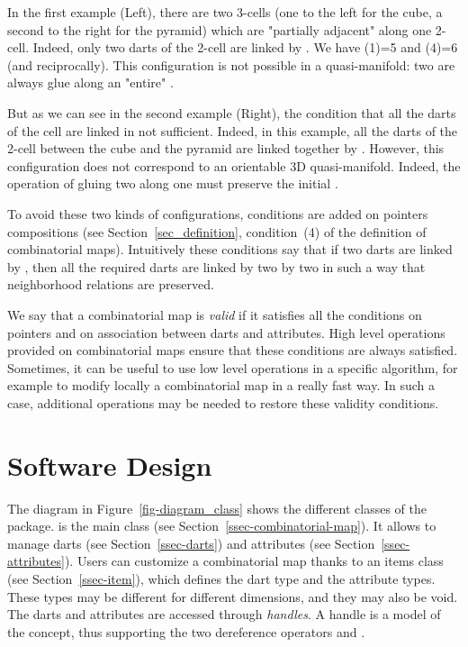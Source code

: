In the first example (Left), there are two 3-cells (one to the left
for the cube, a second to the right for the pyramid) which are
"partially adjacent" along one 2-cell. Indeed, only two darts
of the 2-cell are linked by \betatrois{}. We have \betatrois{}(1)=5 and
\betatrois{}(4)=6 (and reciprocally).  This configuration is not possible
in a quasi-manifold: two  are always glue along an "entire"
.

But as we can see in the second example (Right), the condition that
all the darts of the cell are linked in not sufficient. Indeed, in
this example, all the darts of the 2-cell between the cube and the
pyramid are linked together by \betatrois{}. However, this configuration
does not correspond to an orientable 3D quasi-manifold. Indeed, the
operation of gluing two  along one  must
preserve the initial .

To avoid these two kinds of configurations, conditions are added on
\betats{} pointers compositions (see Section~\ref{sec_definition},
condition~(4) of the definition of combinatorial maps). Intuitively
these conditions say that if two darts are linked by \betai{}, then
all the required darts are linked by \betai{} two by two in such a
way that neighborhood relations are preserved.


We say that a combinatorial map is \emph{valid} if it satisfies all
the conditions on \betats{} pointers and on association between darts
and attributes.  High level operations provided on combinatorial maps
ensure that these conditions are always satisfied. Sometimes, it can
be useful to use low level operations in a specific algorithm, for
example to modify locally a combinatorial map in a really fast way. In
such a case, additional operations may be needed to restore these
validity conditions.


\section{Software Design}\label{sec-software-design}

The diagram in Figure~\ref{fig-diagram_class} shows the different
classes of the package.   is the main class
(see Section~\ref{ssec-combinatorial-map}). It allows to manage darts
(see Section~\ref{ssec-darts}) and attributes (see
Section~\ref{ssec-attributes}).
Users can customize a combinatorial map thanks to an items class (see
Section~\ref{ssec-item}), which defines the dart type and the
attribute types. These types may be different for different
dimensions, and they may also be void.  The darts and attributes are
accessed through \emph{handles}. A handle is a model of the
 concept, thus supporting the two dereference operators
 and .

